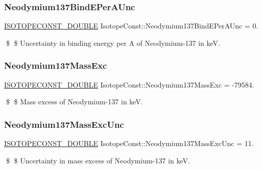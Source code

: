 \subsubsection{\texorpdfstring{Neodymium137\+Bind\+E\+Per\+A\+Unc}{Neodymium137BindEPerAUnc}}
{\footnotesize\ttfamily \mbox{\hyperlink{group___isotope_const-_macros_ga8f45a7272ce02c0b4c65c44636ed719a}{I\+S\+O\+T\+O\+P\+E\+C\+O\+N\+S\+T\+\_\+\+D\+O\+U\+B\+LE}} Isotope\+Const\+::\+Neodymium137\+Bind\+E\+Per\+A\+Unc = 0.}

\$ \$ Uncertainty in binding energy per A of Neodymium-\/137 in keV. \mbox{\label{group___isotope_const-_neodymium-_nd137_gacf2aa0e468af11c51efa070c92645815}} 
\subsubsection{\texorpdfstring{Neodymium137\+Mass\+Exc}{Neodymium137MassExc}}
{\footnotesize\ttfamily \mbox{\hyperlink{group___isotope_const-_macros_ga8f45a7272ce02c0b4c65c44636ed719a}{I\+S\+O\+T\+O\+P\+E\+C\+O\+N\+S\+T\+\_\+\+D\+O\+U\+B\+LE}} Isotope\+Const\+::\+Neodymium137\+Mass\+Exc = -\/79584.}

\$ \$ Mass excess of Neodymium-\/137 in keV. \mbox{\label{group___isotope_const-_neodymium-_nd137_ga9e61e91a16bfcaca58d984de45780001}} 
\subsubsection{\texorpdfstring{Neodymium137\+Mass\+Exc\+Unc}{Neodymium137MassExcUnc}}
{\footnotesize\ttfamily \mbox{\hyperlink{group___isotope_const-_macros_ga8f45a7272ce02c0b4c65c44636ed719a}{I\+S\+O\+T\+O\+P\+E\+C\+O\+N\+S\+T\+\_\+\+D\+O\+U\+B\+LE}} Isotope\+Const\+::\+Neodymium137\+Mass\+Exc\+Unc = 11.}

\$ \$ Uncertainty in mass excess of Neodymium-\/137 in keV. \mbox{\label{group___isotope_const-_neodymium-_nd137_ga638bb50c098cc5435033880146d72e70}} 
